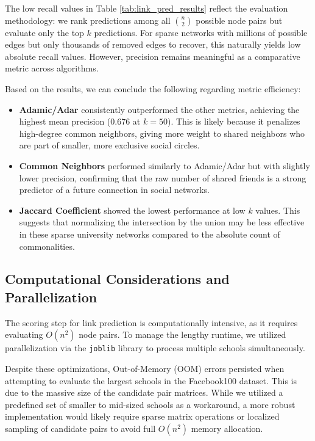 \documentclass[12pt]{article}
\begin{document}
The low recall values in Table \ref{tab:link_pred_results} reflect the evaluation methodology: we rank predictions among all $\binom{n}{2}$ possible node pairs but evaluate only the top $k$ predictions. For sparse networks with millions of possible edges but only thousands of removed edges to recover, this naturally yields low absolute recall values. However, precision remains meaningful as a comparative metric across algorithms.

Based on the results, we can conclude the following regarding metric efficiency:
\begin{itemize}
    \item \textbf{Adamic/Adar} consistently outperformed the other metrics, achieving the highest mean precision (0.676 at $k=50$). This is likely because it penalizes high-degree common neighbors, giving more weight to shared neighbors who are part of smaller, more exclusive social circles.
    \item \textbf{Common Neighbors} performed similarly to Adamic/Adar but with slightly lower precision, confirming that the raw number of shared friends is a strong predictor of a future connection in social networks.
    \item \textbf{Jaccard Coefficient} showed the lowest performance at low $k$ values. This suggests that normalizing the intersection by the union may be less effective in these sparse university networks compared to the absolute count of commonalities.
\end{itemize}

\subsection{Computational Considerations and Parallelization}

The scoring step for link prediction is computationally intensive, as it requires evaluating $O(n^2)$ node pairs. To manage the lengthy runtime, we utilized parallelization via the \texttt{joblib} library to process multiple schools simultaneously.

Despite these optimizations, Out-of-Memory (OOM) errors persisted when attempting to evaluate the largest schools in the Facebook100 dataset. This is due to the massive size of the candidate pair matrices. While we utilized a predefined set of smaller to mid-sized schools as a workaround, a more robust implementation would likely require sparse matrix operations or localized sampling of candidate pairs to avoid full $O(n^2)$ memory allocation.
\end{document}
